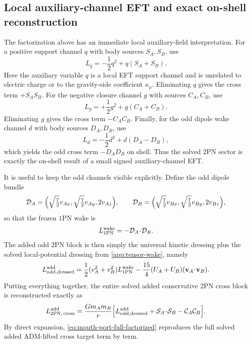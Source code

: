 \documentclass[11pt]{article}
\newcommand{\OnePN}{\mathrm{1PN}}
\newcommand{\TwoPN}{\mathrm{2PN}}
\newcommand{\ADM}{\mathrm{ADM}}
\newcommand{\krho}{\kappa_{\rho}}
\begin{document}
\subsection{Local auxiliary-channel EFT and exact on-shell reconstruction}
\label{app:mouth-port-eft}

The factorization above has an immediate local auxiliary-field interpretation.
For a positive support channel \(q\) with body sources \(S_A,S_B\), use
\begin{equation}
L_q=-\frac12 q^2+q(S_A+S_B).
\label{eq:mouth-port-aux-positive}
\end{equation}
Here the auxiliary variable \(q\) is a local EFT support channel and is unrelated
to electric charge or to the gravity-side coefficient \(\krho\).
Eliminating \(q\) gives the cross term \(+S_AS_B\).
For the negative closure channel \(g\) with sources \(C_A,C_B\), use
\begin{equation}
L_g=+\frac12 g^2+g(C_A+C_B).
\label{eq:mouth-port-aux-negative}
\end{equation}
Eliminating \(g\) gives the cross term \(-C_AC_B\).
Finally, for the odd dipole wake channel \(d\) with body sources \(D_A,D_B\), use
\begin{equation}
L_d=-\frac12 d^2+d(D_A-D_B),
\label{eq:mouth-port-aux-odd}
\end{equation}
which yields the odd cross term \(-D_AD_B\) on shell.
Thus the solved \(\TwoPN\) sector is exactly the on-shell result of a small signed
auxiliary-channel EFT.

It is useful to keep the odd channels visible explicitly.  Define the odd dipole bundle
\begin{equation}
\mathcal D_A=
\Bigl(\sqrt{\tfrac72}v_{Ax},\sqrt{\tfrac72}v_{Ay},2v_{Az}\Bigr),
\qquad
\mathcal D_B=
\Bigl(\sqrt{\tfrac72}v_{Bx},\sqrt{\tfrac72}v_{By},2v_{Bz}\Bigr),
\label{eq:mouth-port-Dodd}
\end{equation}
so that the frozen \(\OnePN\) wake is
\begin{equation}
L^{\rm wake}_{1\mathrm{PN}}=-\mathcal D_A\!\cdot\!\mathcal D_B.
\label{eq:mouth-port-Dodd-wake}
\end{equation}
The added odd \(\TwoPN\) block is then simply the universal kinetic dressing plus the
solved local-potential dressing from \cref{app:tensor-wake}, namely
\begin{equation}
L^{\rm add}_{\rm odd,dressed}
=\frac12(v_A^2+v_B^2)L^{\rm wake}_{1\mathrm{PN}}
-\frac{15}{4}(U_A+U_B)(\mathbf v_A\!\cdot\!\mathbf v_B).
\label{eq:mouth-port-Lodd-dressed}
\end{equation}
Putting everything together, the entire solved added conservative \(\TwoPN\) cross block
is reconstructed exactly as
\begin{equation}
L^{\rm add}_{2\mathrm{PN},\,\mathrm{cross}}
=\frac{Gm_A m_B}{r}
\Bigl[
L^{\rm add}_{\rm odd,dressed}
+\mathcal S_A\!\cdot\!\mathcal S_B
-\mathcal C_A\mathcal C_B
\Bigr].
\label{eq:mouth-port-full-factorized}
\end{equation}
By direct expansion,
\cref{eq:mouth-port-full-factorized} reproduces the full solved added \(\ADM\)-lifted
cross target term by term.
\end{document}
